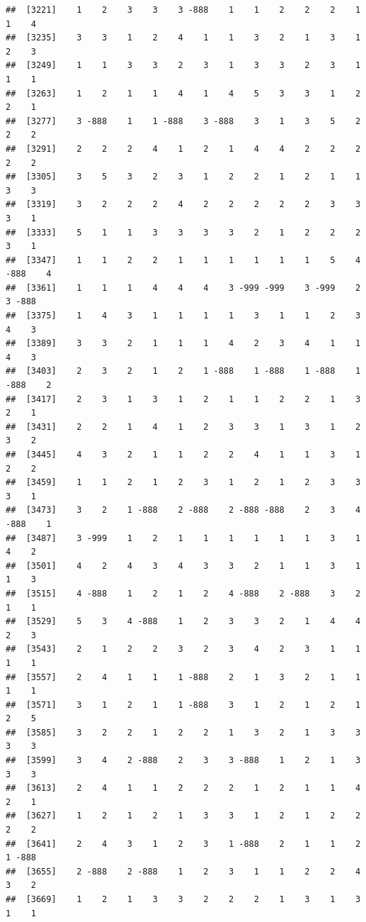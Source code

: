 \documentclass[
  12pt,
  openany]{book}
\begin{document}
\begin{verbatim}
##  [3221]    1    2    3    3    3 -888    1    1    2    2    2    1    1    4
##  [3235]    3    3    1    2    4    1    1    3    2    1    3    1    2    3
##  [3249]    1    1    3    3    2    3    1    3    3    2    3    1    1    1
##  [3263]    1    2    1    1    4    1    4    5    3    3    1    2    2    1
##  [3277]    3 -888    1    1 -888    3 -888    3    1    3    5    2    2    2
##  [3291]    2    2    2    4    1    2    1    4    4    2    2    2    2    2
##  [3305]    3    5    3    2    3    1    2    2    1    2    1    1    3    3
##  [3319]    3    2    2    2    4    2    2    2    2    2    3    3    3    1
##  [3333]    5    1    1    3    3    3    3    2    1    2    2    2    3    1
##  [3347]    1    1    2    2    1    1    1    1    1    1    5    4 -888    4
##  [3361]    1    1    1    4    4    4    3 -999 -999    3 -999    2    3 -888
##  [3375]    1    4    3    1    1    1    1    3    1    1    2    3    4    3
##  [3389]    3    3    2    1    1    1    4    2    3    4    1    1    4    3
##  [3403]    2    3    2    1    2    1 -888    1 -888    1 -888    1 -888    2
##  [3417]    2    3    1    3    1    2    1    1    2    2    1    3    2    1
##  [3431]    2    2    1    4    1    2    3    3    1    3    1    2    3    2
##  [3445]    4    3    2    1    1    2    2    4    1    1    3    1    2    2
##  [3459]    1    1    2    1    2    3    1    2    1    2    3    3    3    1
##  [3473]    3    2    1 -888    2 -888    2 -888 -888    2    3    4 -888    1
##  [3487]    3 -999    1    2    1    1    1    1    1    1    3    1    4    2
##  [3501]    4    2    4    3    4    3    3    2    1    1    3    1    1    3
##  [3515]    4 -888    1    2    1    2    4 -888    2 -888    3    2    1    1
##  [3529]    5    3    4 -888    1    2    3    3    2    1    4    4    2    3
##  [3543]    2    1    2    2    3    2    3    4    2    3    1    1    1    1
##  [3557]    2    4    1    1    1 -888    2    1    3    2    1    1    1    1
##  [3571]    3    1    2    1    1 -888    3    1    2    1    2    1    2    5
##  [3585]    3    2    2    1    2    2    1    3    2    1    3    3    3    3
##  [3599]    3    4    2 -888    2    3    3 -888    1    2    1    3    3    3
##  [3613]    2    4    1    1    2    2    2    1    2    1    1    4    2    1
##  [3627]    1    2    1    2    1    3    3    1    2    1    2    2    2    2
##  [3641]    2    4    3    1    2    3    1 -888    2    1    1    2    1 -888
##  [3655]    2 -888    2 -888    1    2    3    1    1    2    2    4    3    2
##  [3669]    1    2    1    3    3    2    2    2    1    3    1    3    1    1

\end{verbatim}
\end{document}
